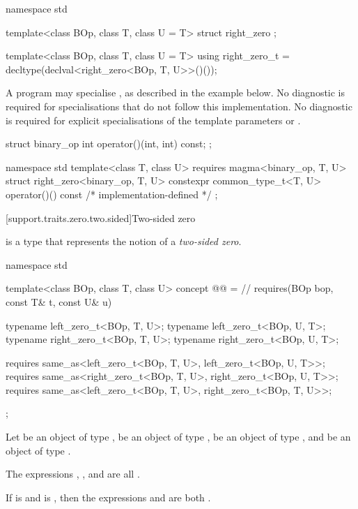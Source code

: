 \begin{itemdecl}
namespace std {
  template<class BOp, class T, class U = T>
  struct right_zero {};

  template<class BOp, class T, class U = T>
  using right_zero_t = decltype(declval<right_zero<BOp, T, U>>()());
}
\end{itemdecl}
\begin{itemdescr}
   \pnum
   A program may specialise , as described in the example below. No diagnostic
   is required for specialisations that do not follow this implementation. No diagnostic is required
   for explicit specialisations of the template parameters  or .
\begin{example}
\begin{codeblock}
struct binary_op {
  int operator()(int, int) const;
};

namespace std {
  template<class T, class U>
  requires magma<binary_op, T, U>
  struct right_zero<binary_op, T, U> {
    constexpr common_type_t<T, U> operator()() const
    { /* implementation-defined */ }
  };
}
\end{codeblock}
\end{example}
\end{itemdescr}

[support.traits.zero.two.sided]{Two-sided zero}

\pnum
{} is a type that represents the notion of a \textit{two-sided zero}.

\begin{itemdecl}
namespace std {
  template<class BOp, class T, class U>
  concept @@ = // \expos
    requires(BOp bop, const T& t, const U& u) {
       typename left_zero_t<BOp, T, U>;
       typename left_zero_t<BOp, U, T>;
       typename right_zero_t<BOp, T, U>;
       typename right_zero_t<BOp, U, T>;

       requires same_as<left_zero_t<BOp, T, U>, left_zero_t<BOp, U, T>>;
       requires same_as<right_zero_t<BOp, T, U>, right_zero_t<BOp, U, T>>;
       requires same_as<left_zero_t<BOp, T, U>, right_zero_t<BOp, T, U>>;
    };
}
\end{itemdecl}
\begin{itemdescr}
   \pnum
   Let  be an object of type ,  be an object of
   type ,  be an object of type
   , and  be an object of type
   .

   \pnum
   The expressions , , and
    are all .

   \pnum
   If  is  and  is , then the
   expressions  and
    are both .
\end{itemdescr}

